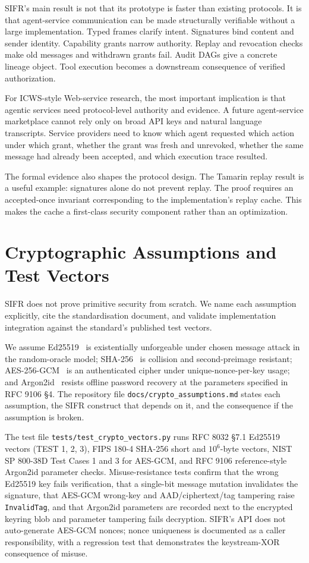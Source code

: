\documentclass[runningheads]{llncs}
\begin{document}
SIFR's main result is not that its prototype is faster than existing protocols. It is that agent-service communication can be made structurally verifiable without a large implementation. Typed frames clarify intent. Signatures bind content and sender identity. Capability grants narrow authority. Replay and revocation checks make old messages and withdrawn grants fail. Audit DAGs give a concrete lineage object. Tool execution becomes a downstream consequence of verified authorization.

For ICWS-style Web-service research, the most important implication is that agentic services need protocol-level authority and evidence. A future agent-service marketplace cannot rely only on broad API keys and natural language transcripts. Service providers need to know which agent requested which action under which grant, whether the grant was fresh and unrevoked, whether the same message had already been accepted, and which execution trace resulted.

The formal evidence also shapes the protocol design. The Tamarin replay result is a useful example: signatures alone do not prevent replay. The proof requires an accepted-once invariant corresponding to the implementation's replay cache. This makes the cache a first-class security component rather than an optimization.

\section{Cryptographic Assumptions and Test Vectors}
\label{sec:crypto-assumptions}

SIFR does not prove primitive security from scratch. We name each
assumption explicitly, cite the standardisation document, and validate
implementation integration against the standard's published test vectors.

We assume Ed25519~\cite{rfc8032} is existentially unforgeable under chosen
message attack in the random-oracle model; SHA-256~\cite{fips180-4} is
collision and second-preimage resistant; AES-256-GCM~\cite{nist80038d} is
an authenticated cipher under unique-nonce-per-key usage; and
Argon2id~\cite{rfc9106} resists offline password recovery at the
parameters specified in RFC 9106 §4. The repository file
\texttt{docs/crypto\_assumptions.md} states each assumption, the SIFR
construct that depends on it, and the consequence if the assumption is
broken.

The test file \texttt{tests/test\_crypto\_vectors.py} runs RFC 8032
§7.1 Ed25519 vectors (TEST 1, 2, 3), FIPS 180-4 SHA-256 short and
$10^{6}$-byte vectors, NIST SP 800-38D Test Cases 1 and 3 for AES-GCM,
and RFC 9106 reference-style Argon2id parameter checks. Misuse-resistance tests confirm
that the wrong Ed25519 key fails verification, that a single-bit message
mutation invalidates the signature, that AES-GCM wrong-key and
AAD/ciphertext/tag tampering raise \texttt{InvalidTag}, and that Argon2id parameters are
recorded next to the encrypted keyring blob and parameter tampering fails decryption. SIFR's API does
not auto-generate AES-GCM nonces; nonce uniqueness is documented as a
caller responsibility, with a regression test that demonstrates the
keystream-XOR consequence of misuse.
\end{document}
